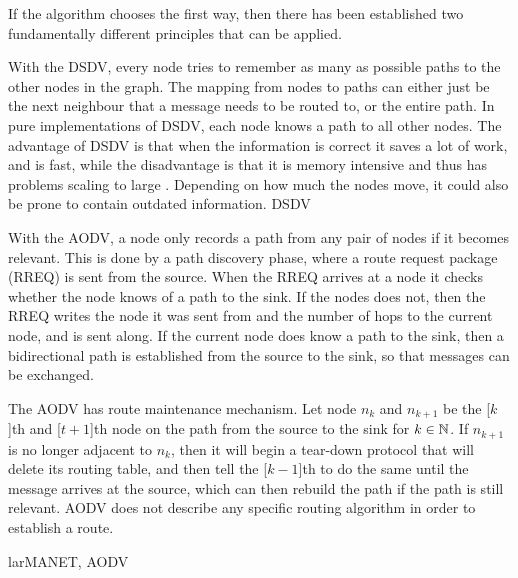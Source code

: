 \documentclass[letter, 12pt, english, draft]{article}
\begin{document}
If the algorithm chooses the first way, then there has been established two fundamentally different principles that can be applied.
\begin{description}
{With the DSDV, every node tries to remember as many as possible paths to the other nodes in the graph. The mapping from nodes to paths can either just be the next neighbour that a message needs to be routed to, or the entire path. In pure implementations of DSDV, each node knows a path to all other nodes. The advantage of DSDV is that when the information is correct it saves a lot of work, and is fast, while the disadvantage is that it is memory intensive and thus has problems scaling to large \manet. Depending on how much the nodes move, it could also be prone to contain outdated information.
}
{DSDV}

{With the AODV, a node only records a path from any pair of nodes if it becomes relevant. This is done by a path discovery phase, where a route request package (RREQ) is sent from the source. When the RREQ arrives at a node it checks whether the node knows of a path to the sink. If the nodes does not, then the RREQ writes the node it was sent from and the number of hops to the current node, and is sent along. If the current node does know a path to the sink, then a bidirectional path is established from the source to the sink, so that messages can be exchanged.

The AODV has route maintenance mechanism. Let node $n_k$ and $n_{k+1}$ be the [$k$]th and [$t+1$]th node on the path from the source to the sink for $k \in \mathbb{N}$. If $n_{k+1}$ is no longer adjacent to $n_{k}$, then it will begin a tear-down protocol that will delete its routing table, and then tell the [$k-1$]th to do the same until the message arrives at the source, which can then rebuild the path if the path is still relevant.
AODV does not describe any specific routing algorithm in order to establish a route.}
{larMANET, AODV}

\end{description}
\end{document}
